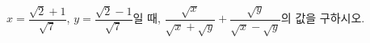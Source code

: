 $x=\dfrac{\sqrt{2}+1}{\sqrt{7}}$, $y=\dfrac{\sqrt{2}-1}{\sqrt{7}}$일 때, $\dfrac{\sqrt{x}}{\sqrt{x}+\sqrt{y}}+\dfrac{\sqrt{y}}{\sqrt{x}-\sqrt{y}}$의 값을 구하시오.
